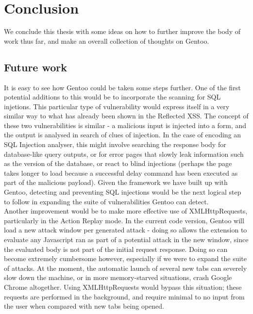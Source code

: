 \chapter{Conclusion}

We conclude this thesis with some ideas on how to further improve the body of work thus far, and make an overall collection of thoughts on Gentoo. \\

\section{Future work}

It is easy to see how Gentoo could be taken some steps further. One of the first potential additions to this would be to incorporate the scanning for SQL injetions. This particular type of vulnerability would express itself in a very similar way to what has already been shown in the Reflected XSS. The concept of these two vulnerabilities is similar - a malicious input is injected into a form, and the output is analysed in search of clues of injection. In the case of encoding an SQL Injection analyser, this might involve searching the response body for database-like query outputs, or for error pages that slowly leak information such as the version of the database, or react to blind injections (perhaps the page takes longer to load because a successful delay command has been executed as part of the malicious payload). Given the framework we have built up with Gentoo, detecting and preventing SQL injections would be the next logical step to follow in expanding the suite of vulnerabilities Gentoo can detect. \\

Another improvement would be to make more effective use of XMLHttpRequests, particularly in the Action Replay mode. In the current code version, Gentoo will load a new attack window per generated attack - doing so allows the extension to evaluate any Javascript ran as part of a potential attack in the new window, since the evaluated body is not part of the initial request response. Doing so can become extremely cumbersome however, especially if we were to expand the suite of attacks. At the moment, the automatic launch of several new tabs can severely slow down the machine, or in more memory-starved situations, crash Google Chrome altogether. Using XMLHttpRequests would bypass this situation; these requests are performed in the background, and require minimal to no input from the user when compared with new tabs being opened. \\

